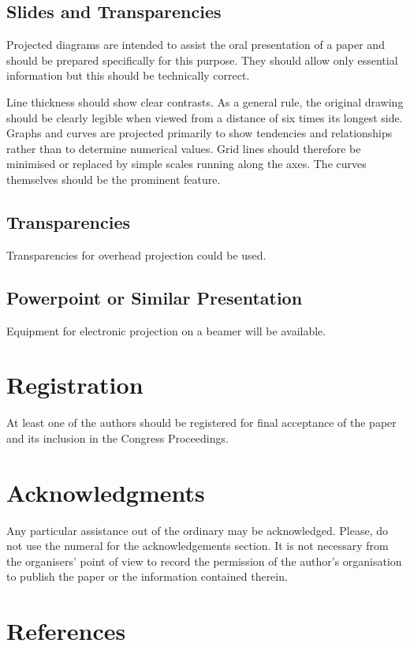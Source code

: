 \documentclass[a4paper]{article}
\begin{document}
\subsection{Slides and Transparencies}
Projected diagrams are intended to assist the oral presentation of
a paper and should be prepared specifically for this purpose. They
should allow only essential information but this should be
technically correct.

Line thickness should show clear contrasts.  As a general rule,
the original drawing should be clearly legible when viewed from a
distance of six times its longest side. Graphs and curves are
projected primarily to show tendencies and relationships rather
than to determine numerical values.  Grid lines should therefore
be minimised or replaced by simple scales running along the axes.
The curves themselves should be the prominent feature.

\subsection{Transparencies}

Transparencies for overhead projection could be used.

\subsection{Powerpoint or Similar Presentation}

Equipment for electronic projection on a beamer will be available.

\section{Registration}

At least one of the authors should be registered for final
acceptance of the paper and its inclusion in the Congress
Proceedings.


\section*{Acknowledgments}
Any particular assistance out of the ordinary may be acknowledged.  Please, do not use the numeral for the acknowledgements section. It is not necessary from the organisers' point of view to record the permission of the author's organisation to publish the paper or the information contained therein.

\section*{References}
\end{document}
